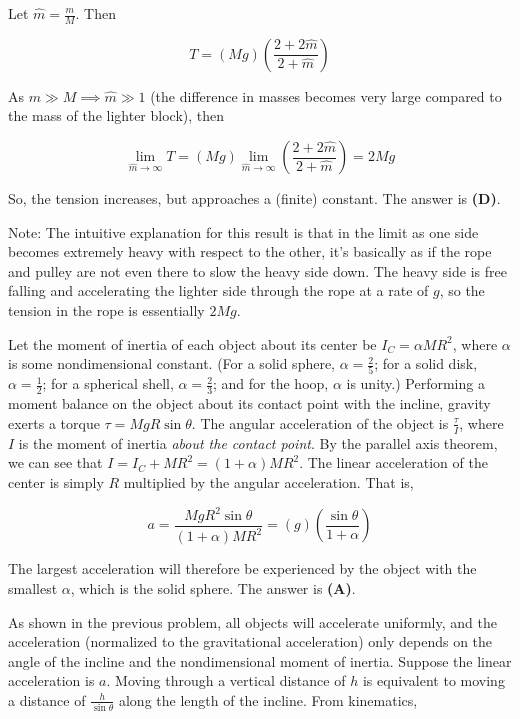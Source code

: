 \documentclass[12pt]{article}
\begin{document}
Let $\hat{m} = \frac{m}{M}$. Then

$$T = (M g) \left( \frac{2 + 2 \hat{m}}{2 + \hat{m}} \right)$$

As $m \gg M \implies \hat{m} \gg 1$ (the difference in masses becomes very large compared to the mass of the lighter block), then

$$\lim_{\hat{m} \to \infty} T = (M g) \lim_{\hat{m} \to \infty} \left( \frac{2 + 2 \hat{m}}{2 + \hat{m}} \right) = 2 M g$$

So, the tension increases, but approaches a (finite) constant. The answer is \textbf{(D)}.

Note: The intuitive explanation for this result is that in the limit as one side becomes extremely heavy with respect to the other, it's basically as if the rope and pulley are not even there to slow the heavy side down. The heavy side is free falling and accelerating the lighter side through the rope at a rate of $g$, so the tension in the rope is essentially $2 M g$.


\vspace{2 \baselineskip}



Let the moment of inertia of each object about its center be $I_C = \alpha M R^2$, where $\alpha$ is some nondimensional constant. (For a solid sphere, $\alpha = \frac{2}{5}$; for a solid disk, $\alpha = \frac{1}{2}$; for a spherical shell, $\alpha = \frac{2}{3}$; and for the hoop, $\alpha$ is unity.) Performing a moment balance on the object about its contact point with the incline, gravity exerts a torque $\tau = M g R \sin \theta$. The angular acceleration of the object is $\frac{\tau}{I}$, where $I$ is the moment of inertia \textit{about the contact point}. By the parallel axis theorem, we can see that $I = I_C + M R^2 = (1 + \alpha) M R^2$. The linear acceleration of the center is simply $R$ multiplied by the angular acceleration. That is,

$$a = \frac{M g R^2 \sin \theta}{(1 + \alpha) M R^2} = (g) \left( \frac{\sin \theta}{1 + \alpha} \right)$$

The largest acceleration will therefore be experienced by the object with the smallest $\alpha$, which is the solid sphere. The answer is \textbf{(A)}.


\vspace{2 \baselineskip}



As shown in the previous problem, all objects will accelerate uniformly, and the acceleration (normalized to the gravitational acceleration) only depends on the angle of the incline and the nondimensional moment of inertia. Suppose the linear acceleration is $a$. Moving through a vertical distance of $h$ is equivalent to moving a distance of $\frac{h}{\sin \theta}$ along the length of the incline. From kinematics,
\end{document}
